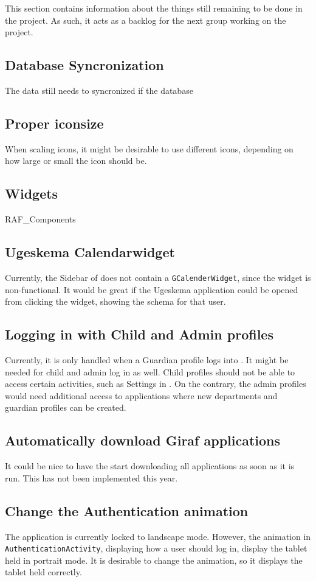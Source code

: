 This section contains information about the things still remaining to be done in the \launcher project.
As such, it acts as a backlog for the next group working on the project.

\subsection{Database Syncronization}
The data still needs to syncronized if the database

\subsection{Proper iconsize}
When scaling icons, it might be desirable to use different icons, depending on how large or small the icon should be.

\subsection{Widgets}
RAF\_Components

\subsection{Ugeskema Calendarwidget}
Currently, the Sidebar of \launcher does not contain a \lstinline!GCalenderWidget!, since the widget is non-functional.
It would be great if the Ugeskema application could be opened from clicking the widget, showing the schema for that user.

\subsection{Logging in with Child and Admin profiles}
Currently, it is only handled when a Guardian profile logs into \launcher.
It might be needed for child and admin log in as well.
Child profiles should not be able to access certain activities, such as Settings in \launcher.
On the contrary, the admin profiles would need additional access to applications where new departments and guardian profiles can be created.

\subsection{Automatically download Giraf applications}
It could be nice to have the \launcher start downloading all \giraf applications as soon as it is run.
This has not been implemented this year.

\subsection{Change the Authentication animation}
The application is currently locked to landscape mode.
However, the animation in \lstinline!AuthenticationActivity!, displaying how a user should log in, display the tablet held in portrait mode.
It is desirable to change the animation, so it displays the tablet held correctly.

